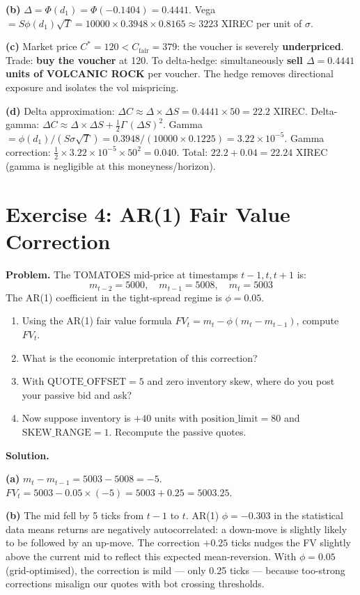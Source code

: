 \documentclass[12pt,a4paper,openany]{report}
\theoremstyle{definition}
\begin{document}
\textbf{(b)} $\Delta = \Phi(d_1) = \Phi(-0.1404) = 0.4441$. Vega $= S\phi(d_1)\sqrt{T} = 10000 \times 0.3948 \times 0.8165 \approx 3223$ XIREC per unit of $\sigma$.

\textbf{(c)} Market price $C^* = 120 < C_{\text{fair}} = 379$: the voucher is severely \textbf{underpriced}. Trade: \textbf{buy the voucher} at 120. To delta-hedge: simultaneously \textbf{sell $\Delta = 0.4441$ units of VOLCANIC ROCK} per voucher. The hedge removes directional exposure and isolates the vol mispricing.

\textbf{(d)} Delta approximation: $\Delta C \approx \Delta \times \Delta S = 0.4441 \times 50 = 22.2$ XIREC. Delta-gamma: $\Delta C \approx \Delta \times \Delta S + \frac{1}{2}\Gamma\,(\Delta S)^2$. Gamma $= \phi(d_1)/(S\sigma\sqrt{T}) = 0.3948/(10000 \times 0.1225) = 3.22 \times 10^{-5}$. Gamma correction: $\frac{1}{2} \times 3.22\times10^{-5} \times 50^2 = 0.040$. Total: $22.2 + 0.04 = 22.24$ XIREC (gamma is negligible at this moneyness/horizon).

\section*{Exercise 4: AR(1) Fair Value Correction}

\textbf{Problem.} The TOMATOES mid-price at timestamps $t-1, t, t+1$ is:
\[
  m_{t-2} = 5000,\quad m_{t-1} = 5008,\quad m_t = 5003
\]
The AR(1) coefficient in the tight-spread regime is $\phi = 0.05$.

\begin{enumerate}[label=(\alph*)]
  \item Using the AR(1) fair value formula $FV_t = m_t - \phi(m_t - m_{t-1})$, compute $FV_t$.
  \item What is the economic interpretation of this correction?
  \item With $\text{QUOTE\_OFFSET} = 5$ and zero inventory skew, where do you post your passive bid and ask?
  \item Now suppose inventory is $+40$ units with $\text{position\_limit} = 80$ and $\text{SKEW\_RANGE} = 1$. Recompute the passive quotes.
\end{enumerate}

\textbf{Solution.}

\textbf{(a)} $m_t - m_{t-1} = 5003 - 5008 = -5$. $FV_t = 5003 - 0.05 \times (-5) = 5003 + 0.25 = 5003.25$.

\textbf{(b)} The mid fell by 5 ticks from $t-1$ to $t$. AR(1) $\phi = -0.303$ in the statistical data means returns are negatively autocorrelated: a down-move is slightly likely to be followed by an up-move. The correction $+0.25$ ticks nudges the FV slightly above the current mid to reflect this expected mean-reversion. With $\phi = 0.05$ (grid-optimised), the correction is mild — only 0.25 ticks — because too-strong corrections misalign our quotes with bot crossing thresholds.
\end{document}
